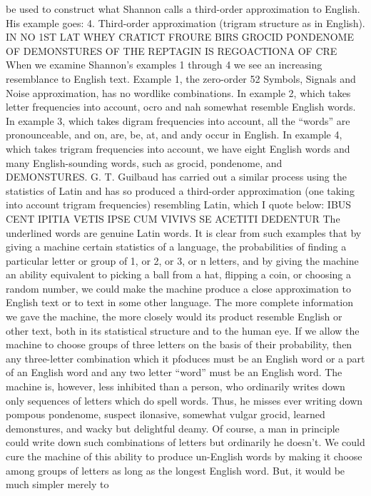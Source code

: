 be used to construct what Shannon calls a third-order approximation
to English. His example goes:
4. Third-order approximation (trigram structure as in English).
IN NO 1ST LAT WHEY CRATICT FROURE BIRS
GROCID PONDENOME OF DEMONSTURES OF THE
REPTAGIN IS REGOACTIONA OF CRE
When we examine Shannon’s examples 1 through 4 we see an
increasing resemblance to English text. Example 1, the zero-order
52
Symbols, Signals and Noise
approximation, has no wordlike combinations. In example 2, which
takes letter frequencies into account, ocro and nah somewhat
resemble English words. In example 3, which takes digram frequencies
into account, all the “words” are pronounceable, and on, are,
be, at, and andy occur in English. In example 4, which takes
trigram frequencies into account, we have eight English words and
many English-sounding words, such as grocid, pondenome, and
DEMONSTURES.
G. T. Guilbaud has carried out a similar process using the
statistics of Latin and has so produced a third-order approximation
(one taking into account trigram frequencies) resembling Latin,
which I quote below:
IBUS CENT IPITIA VETIS IPSE CUM VIVIVS
SE ACETITI DEDENTUR
The underlined words are genuine Latin words.
It is clear from such examples that by giving a machine certain
statistics of a language, the probabilities of finding a particular
letter or group of 1, or 2, or 3, or n letters, and by giving the
machine an ability equivalent to picking a ball from a hat, flipping
a coin, or choosing a random number, we could make the machine
produce a close approximation to English text or to text in some
other language. The more complete information we gave the
machine, the more closely would its product resemble English or
other text, both in its statistical structure and to the human eye.
If we allow the machine to choose groups of three letters on the
basis of their probability, then any three-letter combination which
it pfoduces must be an English word or a part of an English word
and any two letter “word” must be an English word. The machine
is, however, less inhibited than a person, who ordinarily writes
down only sequences of letters which do spell words. Thus, he
misses ever writing down pompous pondenome, suspect ilonasive,
somewhat vulgar grocid, learned demonstures, and wacky but
delightful deamy. Of course, a man in principle could write down
such combinations of letters but ordinarily he doesn’t.
We could cure the machine of this ability to produce un-English
words by making it choose among groups of letters as long as the
longest English word. But, it would be much simpler merely to
